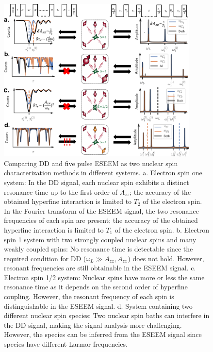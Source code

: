 \documentclass[%
 reprint,
superscriptaddress,
 amsmath,amssymb,
 aps,
]{revtex4-2}
\begin{document}
\begin{figure}%
	\begin{center}
		\includegraphics[width=0.9\textwidth]{pict/drawing0.pdf}
		\caption{Comparing DD and five pulse ESEEM as two nuclear spin characterization methods in different systems. a. Electron spin one system: In the DD signal, each nuclear spin exhibits a distinct resonance time up to the first order of $A_{zz}$; the accuracy of the obtained hyperfine interaction is limited to $T_2$ of the electron spin. In the Fourier transform of the ESEEM signal, the two resonance frequencies of each spin are present; the accuracy of the obtained hyperfine interaction is limited to $T_1$ of the electron spin. b. Electron spin 1 system with two strongly coupled nuclear spins and many weakly coupled spins: No resonance time is detectable since the required condition for DD ($\omega_L \gg A_{zz}, A_{zx}$) does not hold. However, resonant frequencies are still obtainable in the ESEEM signal. c. Electron spin 1/2 system: Nuclear spins have more or less the same resonance time as it depends on the second order of hyperfine coupling. However, the resonant frequency of each spin is distinguishable in the ESEEM signal. d. System containing two different nuclear spin species: Two nuclear spin baths can interfere in the DD signal, making the signal analysis more challenging. However, the species can be inferred from the ESEEM signal since species have different Larmor frequencies.}
		\label{fig:1}
	\end{center}
\end{figure}
\end{document}
